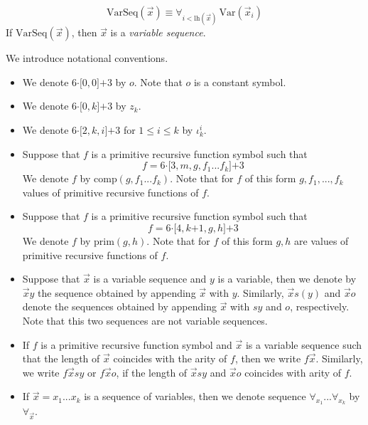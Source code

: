 \documentclass[10pt]{amsart}
\newcommand{\mforall}{\boldsymbol{\forall}}
\newcommand{\mle}{\boldsymbol{<}}
\newcommand{\mleq}{\boldsymbol{\leq}}
\newcommand{\meq}{\boldsymbol{=}}
\newcommand{\mplus}{\boldsymbol{+}}
\newcommand{\mdot}{\boldsymbol{\cdot}}
\begin{document}
\begin{definition}
	$$\mathrm{VarSeq}(\vec{x}) \equiv \mforall_{i \mle \mathrm{lh}(\vec{x})}\,\mathrm{Var}(\vec{x}_i)$$
	If $\mathrm{VarSeq}(\vec{x})$, then $\vec{x}$ is a \textit{variable sequence}.
\end{definition}

\begin{remark}\label{remark:standard_notation_for_composition_and_primitive_recursive_contructors}
	We introduce notational conventions.
	\begin{itemize}
		\item[] We denote $6\mdot \pmb{[}0,0\pmb{]} \mplus 3$ by $o$. Note that $o$ is a constant symbol.
		\item[] We denote $6\mdot \pmb{[}0,k\pmb{]} \mplus 3$ by $z_k$.
		\item[] We denote $6 \mdot \pmb{[}2,k,i\pmb{]} \mplus 3$ for $1 \mleq i \mleq k$ by $\iota^i_k$.
		\item[] Suppose that $f$ is a primitive recursive function symbol such that
		      $$f \meq 6\mdot \pmb{[}3,m,g,f_1...f_k\pmb{]}\mplus 3$$
		      We denote $f$ by $\mathrm{comp}(g,f_1...f_k)$. Note that for $f$ of this form $g,f_1,...,f_k$ values of primitive recursive functions of $f$.
		\item[] Suppose that $f$ is a primitive recursive function symbol such that
		      $$f \meq 6 \mdot \pmb{[}4, k \mplus 1, g, h\pmb{]}\mplus 3$$
		      We denote $f$ by $\mathrm{prim}(g,h)$. Note that for $f$ of this form $g,h$ are values of primitive recursive functions of $f$.
		\item[] Suppose that $\vec{x}$ is a variable sequence and $y$ is a variable, then we denote by $\vec{x}y$ the sequence obtained by appending $\vec{x}$ with $y$. Similarly, $\vec{x}s(y)$ and $\vec{x}o$ denote the sequences obtained by appending $\vec{x}$ with $sy$ and $o$, respectively. Note that this two sequences are not variable sequences.
		\item[] If $f$ is a primitive recursive function symbol and $\vec{x}$ is a variable sequence such that the length of $\vec{x}$ coincides with the arity of $f$, then we write $f\vec{x}$. Similarly, we write $f\vec{x}sy$ or $f\vec{x}o$, if the length of $\vec{x}sy$ and $\vec{x}o$ coincides with arity of $f$.
		\item[] If $\vec{x} \meq x_1...x_k$ is a sequence of variables, then we denote sequence $\forall_{x_1}...\forall_{x_k}$ by $\forall_{\vec{x}}$.
	\end{itemize}
\end{remark}
\end{document}
